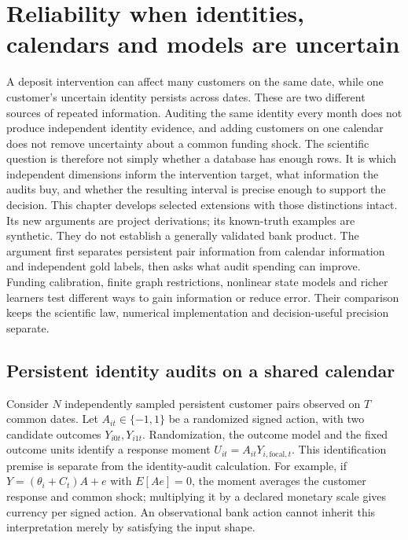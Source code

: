 \chapter{Reliability when identities, calendars and models are uncertain}
\label{r8:reliability}

A deposit intervention can affect many customers on the same date, while one
customer's uncertain identity persists across dates. These are two different
sources of repeated information. Auditing the same identity every month does
not produce independent identity evidence, and adding customers on one calendar
does not remove uncertainty about a common funding shock. The scientific
question is therefore not simply whether a database has enough rows. It is
which independent dimensions inform the intervention target, what information
the audits buy, and whether the resulting interval is precise enough to support
the decision. This chapter develops selected extensions with those distinctions
intact. Its new arguments are project derivations; its known-truth examples are
synthetic. They do not establish a generally validated bank product. The argument first separates persistent pair information from calendar information and independent gold labels, then asks what audit spending can improve. Funding calibration, finite graph restrictions, nonlinear state models and richer learners test different ways to gain information or reduce error. Their comparison keeps the scientific law, numerical implementation and decision-useful precision separate.

\section{Persistent identity audits on a shared calendar}
\label{r8:joint}

Consider $N$ independently sampled persistent customer pairs observed on $T$
common dates. Let $A_{it}\in\{-1,1\}$ be a randomized signed action, with two
candidate outcomes $Y_{i0t},Y_{i1t}$. Randomization, the outcome model and the
fixed outcome units identify a response moment $U_{it}=A_{it}Y_{i,\mathrm{focal},t}$.
This identification premise is separate from the identity-audit calculation.
For example, if $Y=(\theta_i+C_t)A+e$ with $E[Ae]=0$, the moment averages the
customer response and common shock; multiplying it by a declared monetary
scale gives currency per signed action. An observational bank action cannot
inherit this interpretation merely by satisfying the input shape.


